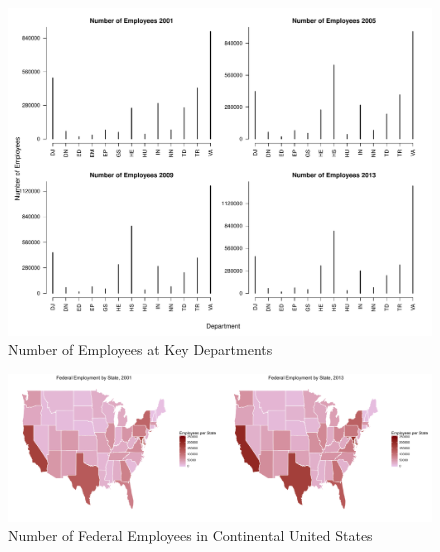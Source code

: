 \documentclass{article}
\begin{document}
\begin{center}
    \begin{figure}
        \includegraphics[scale=0.4]{./images/simple-stat-agency.pdf}
        \caption{Number of Employees at Key Departments}
        \label{simpleagency}
    \end{figure}
\end{center}

\begin{center}
    \begin{figure}
        \includegraphics[scale=0.3]{./images/employment-by-state-2001-2013.png}
        \caption{Number of Federal Employees in Continental United States}
        \label{employmentheatmap}
    \end{figure}
\end{center}
\end{document}
